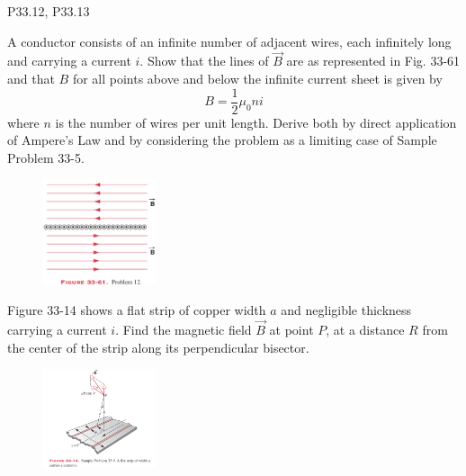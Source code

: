 \documentclass[11pt,letterpaper,boxed]{pset}
\begin{document}
    \begin{center}
        P33.12, P33.13
    \end{center}
    
    \begin{problem} [P33.12]
    A conductor consists of an infinite number of adjacent wires, each infinitely long and carrying a current $i$. Show that the lines of $\Vec{B}$ are as represented in Fig. 33-61 and that $B$ for all points above and below the infinite current sheet is given by \[B = \frac{1}{2}\mu_0ni\]
    where $n$ is the number of wires per unit length. Derive both by direct application of Ampere's Law and by considering the problem as a limiting case of Sample Problem 33-5.
    \end{problem}
    
    \begin{figure} [ht]
        \includegraphics[width=125px]{HW7Images/P33-12.png}
        \label{fig:P33-11}
    \end{figure}
    \newpage
    
    \begin{problem} 
    Figure 33-14 shows a flat strip of copper width $a$ and negligible thickness carrying a current $i$. Find the magnetic field $\Vec{B}$ at point $P$, at a distance $R$ from the center of the strip along its perpendicular bisector.
    \end{problem}
    
    \begin{figure} [ht]
    \centering
        \includegraphics[width=125px]{HW7Images/33-5.png}
        \label{fig:P33-5}
    \end{figure}
    
\end{document}
